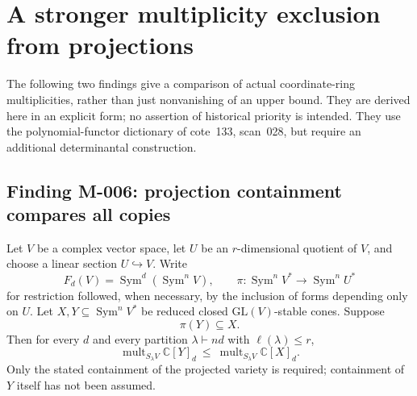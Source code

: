 \section{A stronger multiplicity exclusion from projections}

The following two findings give a comparison of actual coordinate-ring
multiplicities, rather than just nonvanishing of an upper bound.
They are derived here in an explicit form; no assertion of historical
priority is intended. They use the polynomial-functor dictionary of
cote~133, scan~028, but require an additional determinantal construction.

\subsection*{Finding M-006: projection containment compares all copies}
Let \(V\) be a complex vector space, let \(U\) be an \(r\)-dimensional
quotient of \(V\), and choose a linear section \(U\hookrightarrow V\).
Write
\[
 F_d(V)=\operatorname{Sym}^d(\operatorname{Sym}^n V),\qquad
 \pi:\operatorname{Sym}^n V^*\longrightarrow
      \operatorname{Sym}^n U^*
\]
for restriction followed, when necessary, by the inclusion of forms
depending only on \(U\).
Let \(X,Y\subseteq\operatorname{Sym}^n V^*\) be reduced closed
\(\mathrm{GL}(V)\)-stable cones. Suppose
\begin{equation}\label{eq:M006hyp}
                         \pi(Y)\subseteq X.
\end{equation}
Then for every \(d\) and every partition \(\lambda\vdash nd\)
with \(\ell(\lambda)\leq r\),
\begin{equation}\label{eq:M006}
 \operatorname{mult}_{S_\lambda V}\mathbb C[Y]_d
 \ \leq\
 \operatorname{mult}_{S_\lambda V}\mathbb C[X]_d.
\end{equation}
Only the stated containment of the projected variety is required;
containment of \(Y\) itself has not been assumed.

